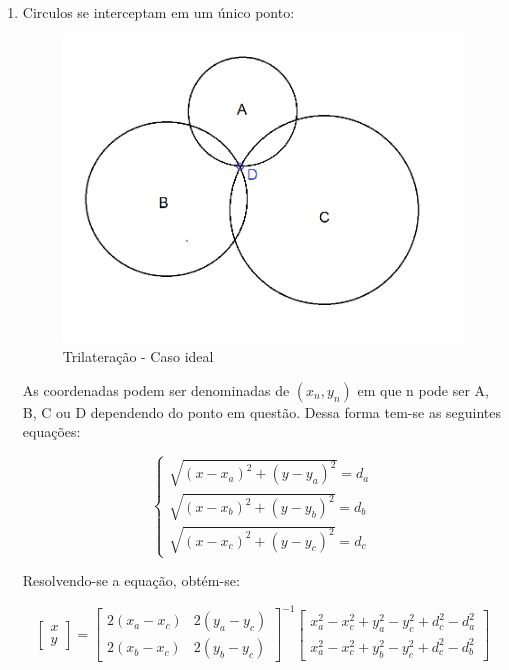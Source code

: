 \begin{enumerate}

	\item Circulos se interceptam em um único ponto:
	
	\begin{figure}[H]
		\centering 
		\includegraphics[scale = 0.8]{images/trilateration1.png}
		\caption{Trilateração - Caso ideal}
		\label{fig:trilateration.png}
	\end{figure}
	
	
	As coordenadas podem ser denominadas de \( (x_n, y_n) \) em que n pode ser A, B, C ou D dependendo do ponto em questão. Dessa forma tem-se as seguintes equações:
	
	\begin{equation*}
	\begin{cases} \sqrt{(x - x_a)^2 + (y - y_a)^2} = d_a \\ \sqrt{(x - x_b)^2 + (y - y_b)^2} = d_b \\ \sqrt{(x - x_c)^2 + (y - y_c)^2} = d_c \end{cases}
	\end{equation*}
	
	Resolvendo-se a equação, obtém-se:
	
	\begin{equation*}
	\begin{bmatrix} 
		x \\
		y
	\end{bmatrix} = 
	\begin{bmatrix} 
		2(x_a - x_c) & 2(y_a - y_c) \\
		2(x_b - x_c) & 2(y_b - y_c)
	\end{bmatrix}^{-1}
	\begin{bmatrix} 
		x_a^2 - x_c^2 + y_a^2 - y_c^2 + d_c^2 - d_a^2 \\
		x_a^2 - x_c^2 + y_b^2 - y_c^2 + d_c^2 - d_b^2
	\end{bmatrix}
	\end{equation*}



\end{enumerate}
